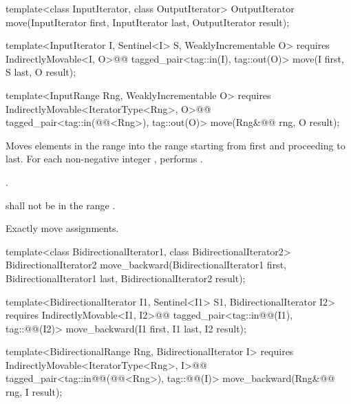%
\begin{removedblock}
\begin{itemdecl}
template<class InputIterator, class OutputIterator>
  OutputIterator move(InputIterator first, InputIterator last,
                      OutputIterator result);
\end{itemdecl}
\end{removedblock}
\begin{addedblock}
\begin{itemdecl}
template<InputIterator I, Sentinel<I> S, WeaklyIncrementable O>
  requires IndirectlyMovable<I, O>@\newtxt{()}@
  tagged_pair<tag::in(I), tag::out(O)>
    move(I first, S last, O result);

template<InputRange Rng, WeaklyIncrementable O>
  requires IndirectlyMovable<IteratorType<Rng>, O>@\newtxt{()}@
  tagged_pair<tag::in(@@<Rng>), tag::out(O)>
    move(Rng&@\newtxt{\&}@ rng, O result);
\end{itemdecl}
\end{addedblock}

\begin{itemdescr}
\pnum
\effects
Moves elements in the range 
into the range 
starting from first and proceeding to last.
For each non-negative integer
,
performs
 .

\pnum
\returns
{}.

\pnum
\requires
{}
shall not be in the range
.

\pnum
\complexity
Exactly
move assignments.
\end{itemdescr}

%
\begin{removedblock}
\begin{itemdecl}
template<class BidirectionalIterator1, class BidirectionalIterator2>
  BidirectionalIterator2
    move_backward(BidirectionalIterator1 first,
                  BidirectionalIterator1 last,
                  BidirectionalIterator2 result);
\end{itemdecl}
\end{removedblock}
\begin{addedblock}
\begin{itemdecl}
template<BidirectionalIterator I1, Sentinel<I1> S1, BidirectionalIterator I2>
  requires IndirectlyMovable<I1, I2>@\newtxt{()}@
  tagged_pair<tag::in@@(I1), tag::@@(I2)>
    move_backward(I1 first, I1 last, I2 result);

template<BidirectionalRange Rng, BidirectionalIterator I>
  requires IndirectlyMovable<IteratorType<Rng>, I>@\newtxt{()}@
  tagged_pair<tag::in@@(@@<Rng>), tag::@@(I)>
    move_backward(Rng&@\newtxt{\&}@ rng, I result);
\end{itemdecl}
\end{addedblock}

